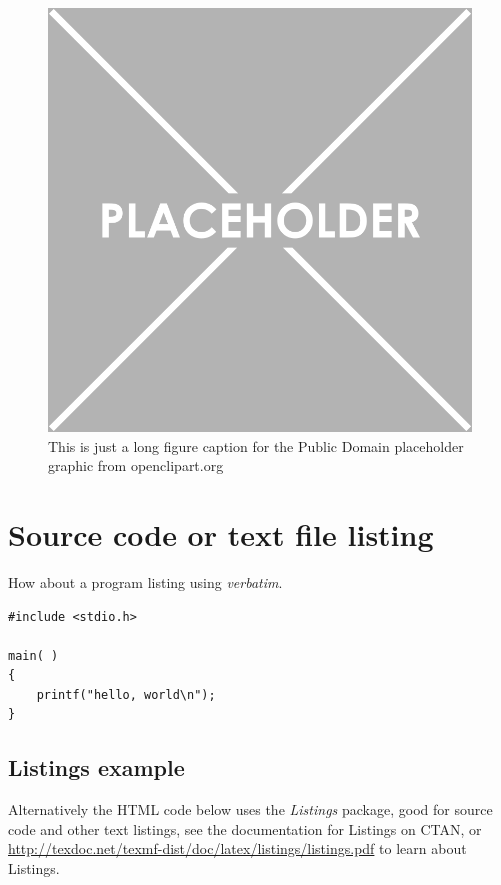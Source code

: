 \begin{figure}[htbp!] 
\centering    
\includegraphics[width=1.0\textwidth]{Placeholder}
\caption[Placeholder]{This is just a long figure caption for the Public Domain placeholder graphic from openclipart.org}
\label{fig:placeholder}
\end{figure}

\clearpage

\section{Source code or text file listing}

How about a program listing using \emph{verbatim}.

\begin{verbatim} 
#include <stdio.h>

main( )
{
    printf("hello, world\n");
}
\end{verbatim}

\subsection{Listings example}

Alternatively the HTML code below uses the \emph{Listings} package, good for source code and other text listings, see the documentation for Listings on CTAN, or \url{http://texdoc.net/texmf-dist/doc/latex/listings/listings.pdf} to learn about Listings.

